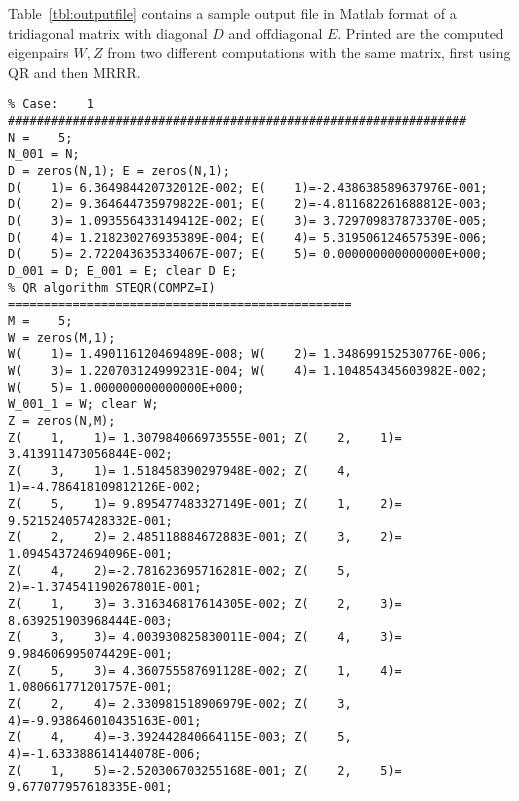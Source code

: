 \documentclass[acmtoms]{acmtrans2m}
\begin{document}
Table~\ref{tbl:outputfile} contains a sample output file in Matlab format
of a tridiagonal matrix with diagonal $D$ and offdiagonal $E$.
Printed are the computed eigenpairs $W, Z$ from two different 
computations with the same matrix, 
first using QR and then MRRR.

\begin{table}[htbp]
\protect \caption{A sample output file generated by {\tt stetester}.
                  The data is printed in Matlab format and stored
                  with a name whose trailing part identifies the test
                  that has been executed} 
         \label{tbl:outputfile} 
\begin{center}
\begin{minipage}[t]{4.5in}
{\scriptsize
\begin{verbatim}
% Case:    1 ################################################################
N =    5;
N_001 = N;
D = zeros(N,1); E = zeros(N,1);
D(    1)= 6.364984420732012E-002; E(    1)=-2.438638589637976E-001; 
D(    2)= 9.364644735979822E-001; E(    2)=-4.811682261688812E-003; 
D(    3)= 1.093556433149412E-002; E(    3)= 3.729709837873370E-005; 
D(    4)= 1.218230276935389E-004; E(    4)= 5.319506124657539E-006; 
D(    5)= 2.722043635334067E-007; E(    5)= 0.000000000000000E+000; 
D_001 = D; E_001 = E; clear D E;
% QR algorithm STEQR(COMPZ=I) ================================================
M =    5;
W = zeros(M,1);
W(    1)= 1.490116120469489E-008; W(    2)= 1.348699152530776E-006; 
W(    3)= 1.220703124999231E-004; W(    4)= 1.104854345603982E-002; 
W(    5)= 1.000000000000000E+000; 
W_001_1 = W; clear W;
Z = zeros(N,M);
Z(    1,    1)= 1.307984066973555E-001; Z(    2,    1)= 3.413911473056844E-002; 
Z(    3,    1)= 1.518458390297948E-002; Z(    4,    1)=-4.786418109812126E-002; 
Z(    5,    1)= 9.895477483327149E-001; Z(    1,    2)= 9.521524057428332E-001; 
Z(    2,    2)= 2.485118884672883E-001; Z(    3,    2)= 1.094543724694096E-001; 
Z(    4,    2)=-2.781623695716281E-002; Z(    5,    2)=-1.374541190267801E-001; 
Z(    1,    3)= 3.316346817614305E-002; Z(    2,    3)= 8.639251903968444E-003; 
Z(    3,    3)= 4.003930825830011E-004; Z(    4,    3)= 9.984606995074429E-001; 
Z(    5,    3)= 4.360755587691128E-002; Z(    1,    4)= 1.080661771201757E-001; 
Z(    2,    4)= 2.330981518906979E-002; Z(    3,    4)=-9.938646010435163E-001; 
Z(    4,    4)=-3.392442840664115E-003; Z(    5,    4)=-1.633388614144078E-006; 
Z(    1,    5)=-2.520306703255168E-001; Z(    2,    5)= 9.677077957618335E-001; 

\end{verbatim}}
\end{minipage}
\end{center}
\end{table}
\end{document}
